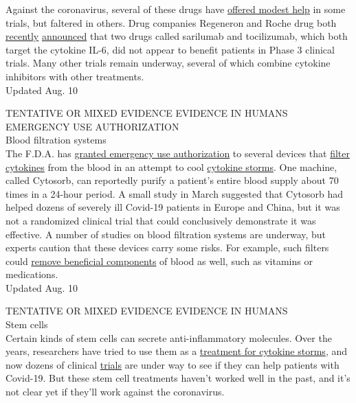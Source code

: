 Against the coronavirus, several of these drugs have
\href{https://www.medrxiv.org/content/10.1101/2020.06.01.20119149v2}{offered
modest help} in some trials, but faltered in others. Drug companies
Regeneron and Roche drug both
\href{https://newsroom.regeneron.com/news-releases/news-release-details/regeneron-and-sanofi-provide-update-kevzarar-sarilumab-phase-3}{recently}
\href{https://www.roche.com/investors/updates/inv-update-2020-07-29.htm}{announced}
that two drugs called sarilumab and tocilizumab, which both target the
cytokine IL-6, did not appear to benefit patients in Phase 3 clinical
trials. Many other trials remain underway, several of which combine
cytokine inhibitors with other treatments.\\
Updated Aug. 10

TENTATIVE OR MIXED EVIDENCE EVIDENCE IN HUMANS EMERGENCY USE
AUTHORIZATION\\
Blood filtration systems\\
The F.D.A. has
\href{https://www.nytimes3xbfgragh.onion/2020/08/10/health/stephen-hahn-fda.html}{granted
emergency use authorization} to several devices that
\href{https://www.nytimes3xbfgragh.onion/2020/06/11/health/coronavirus-cytokine-storm.html}{filter
cytokines} from the blood in an attempt to cool
\href{https://www.nytimes3xbfgragh.onion/2020/06/11/health/coronavirus-cytokine-storm.html}{cytokine
storms}. One machine, called Cytosorb, can reportedly purify a patient's
entire blood supply about 70 times in a 24-hour period. A small study in
March suggested that Cytosorb had helped dozens of severely ill Covid-19
patients in Europe and China, but it was not a randomized clinical trial
that could conclusively demonstrate it was effective. A number of
studies on blood filtration systems are underway, but experts caution
that these devices carry some risks. For example, such filters could
\href{https://www.fda.gov/media/136866/download}{remove beneficial
components} of blood as well, such as vitamins or medications.\\
Updated Aug. 10

TENTATIVE OR MIXED EVIDENCE EVIDENCE IN HUMANS\\
Stem cells\\
Certain kinds of stem cells can secrete anti-inflammatory molecules.
Over the years, researchers have tried to use them as a
\href{https://celltrials.org/news/role-msc-treat-coronavirus-pneumonia-and-ards-part-1-is-emperor-wearing-clothes}{treatment
for cytokine storms}, and now dozens of clinical
\href{https://clinicaltrials.gov/ct2/results?term=stem+cell\&cond=COVID-19\&age_v=\&gndr=\&type=\&rslt=\&phase=0\&phase=1\&phase=2\&phase=3\&Search=Apply}{trials}
are under way to see if they can help patients with Covid-19. But these
stem cell treatments haven't worked well in the past, and it's not clear
yet if they'll work against the coronavirus.

